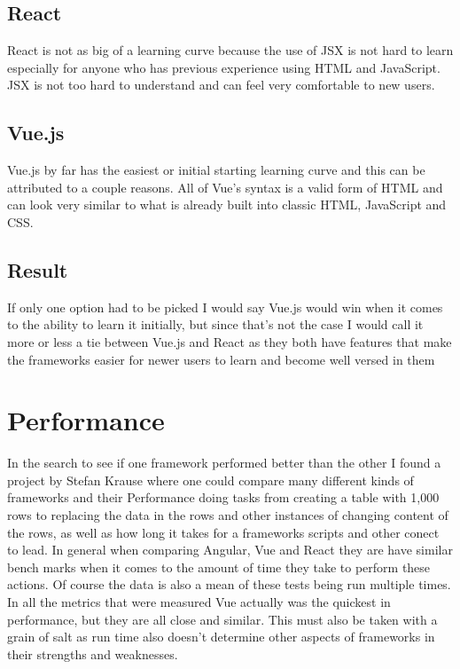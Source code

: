 \documentclass[11pt]{article}
\begin{document}
\subsection{React}
React is not as big of a learning curve because the use of JSX is not hard to learn especially for anyone who has previous experience using HTML and JavaScript. JSX is not too hard to understand and can feel 
very comfortable to new users.

\subsection{Vue.js}
Vue.js by far has the easiest or initial starting learning curve and this can be attributed to a couple reasons. All of Vue's syntax is a valid form of HTML and can look very similar to what is already built into classic HTML,
 JavaScript and CSS.

\subsection{Result}
If only one option had to be picked I would say Vue.js would win when it comes to the ability to learn it initially, but since that's not the case I would call it more or less a tie between Vue.js and React as they both have features
that make the frameworks easier for newer users to learn and become well versed in them

\section{Performance}
In the search to see if one framework performed better than the other I found a project by Stefan Krause \cite{Interact81:online} where one could compare many different kinds of frameworks and their Performance doing tasks from creating 
a table with 1,000 rows to replacing the data in the rows and other instances of changing content of the rows, as well as how long it takes for a frameworks scripts and other conect to lead. In general when comparing Angular, Vue and 
React they are have  similar bench marks when it comes to the amount of time they take to perform these actions. Of course the data is also a mean of these tests being run multiple times. In all the metrics that were measured Vue 
actually was the quickest in performance, but they are all close and similar. This must also be taken with a grain of salt as run time also doesn't determine other aspects of frameworks in their strengths and weaknesses.
\end{document}
